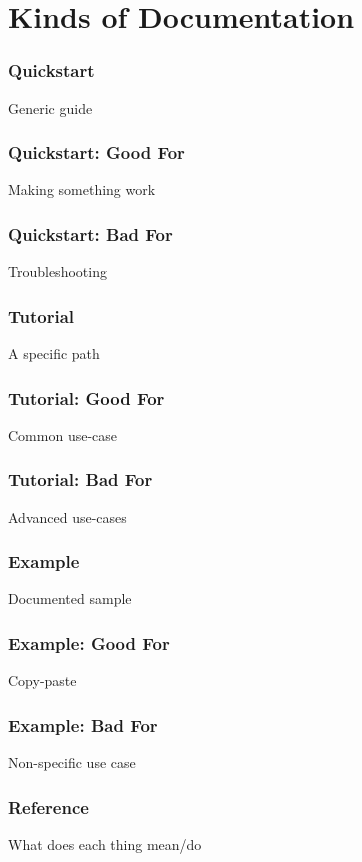 \section{Kinds of Documentation}

\begin{frame}
\frametitle{Quickstart}

Generic guide

\end{frame}

\begin{frame}
\frametitle{Quickstart: Good For}

Making something work
\end{frame}


\begin{frame}
\frametitle{Quickstart: Bad For}

Troubleshooting
\end{frame}


\begin{frame}
\frametitle{Tutorial}

A specific path
\end{frame}


\begin{frame}
\frametitle{Tutorial: Good For}

Common use-case
\end{frame}


\begin{frame}
\frametitle{Tutorial: Bad For}

Advanced use-cases
\end{frame}


\begin{frame}
\frametitle{Example}

Documented sample
\end{frame}


\begin{frame}
\frametitle{Example: Good For}

Copy-paste
\end{frame}


\begin{frame}
\frametitle{Example: Bad For}

Non-specific use case
\end{frame}


\begin{frame}
\frametitle{Reference}

What does each thing mean/do
\end{frame}


